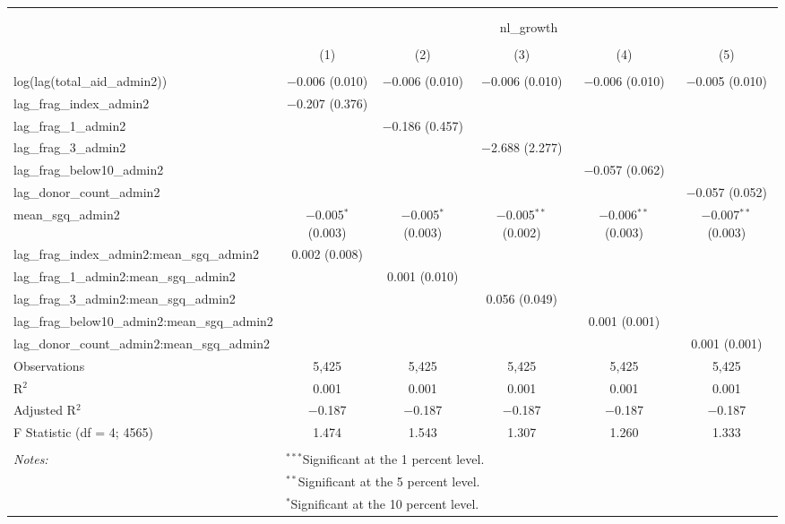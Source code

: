 
\begin{table}[!htbp] \centering 
  \caption{} 
  \label{} 
\begin{tabular}{@{\extracolsep{2pt}}lccccc} 
\\[-1.8ex]\hline 
\hline \\[-1.8ex] 
\\[-1.8ex] & \multicolumn{5}{c}{nl\_growth} \\ 
\\[-1.8ex] & (1) & (2) & (3) & (4) & (5)\\ 
\hline \\[-1.8ex] 
 log(lag(total\_aid\_admin2)) & $-$0.006 (0.010) & $-$0.006 (0.010) & $-$0.006 (0.010) & $-$0.006 (0.010) & $-$0.005 (0.010) \\ 
  lag\_frag\_index\_admin2 & $-$0.207 (0.376) &  &  &  &  \\ 
  lag\_frag\_1\_admin2 &  & $-$0.186 (0.457) &  &  &  \\ 
  lag\_frag\_3\_admin2 &  &  & $-$2.688 (2.277) &  &  \\ 
  lag\_frag\_below10\_admin2 &  &  &  & $-$0.057 (0.062) &  \\ 
  lag\_donor\_count\_admin2 &  &  &  &  & $-$0.057 (0.052) \\ 
  mean\_sgq\_admin2 & $-$0.005$^{*}$ (0.003) & $-$0.005$^{*}$ (0.003) & $-$0.005$^{**}$ (0.002) & $-$0.006$^{**}$ (0.003) & $-$0.007$^{**}$ (0.003) \\ 
  lag\_frag\_index\_admin2:mean\_sgq\_admin2 & 0.002 (0.008) &  &  &  &  \\ 
  lag\_frag\_1\_admin2:mean\_sgq\_admin2 &  & 0.001 (0.010) &  &  &  \\ 
  lag\_frag\_3\_admin2:mean\_sgq\_admin2 &  &  & 0.056 (0.049) &  &  \\ 
  lag\_frag\_below10\_admin2:mean\_sgq\_admin2 &  &  &  & 0.001 (0.001) &  \\ 
  lag\_donor\_count\_admin2:mean\_sgq\_admin2 &  &  &  &  & 0.001 (0.001) \\ 
 Observations & 5,425 & 5,425 & 5,425 & 5,425 & 5,425 \\ 
R$^{2}$ & 0.001 & 0.001 & 0.001 & 0.001 & 0.001 \\ 
Adjusted R$^{2}$ & $-$0.187 & $-$0.187 & $-$0.187 & $-$0.187 & $-$0.187 \\ 
F Statistic (df = 4; 4565) & 1.474 & 1.543 & 1.307 & 1.260 & 1.333 \\ 
\hline \\[-1.8ex] 
\textit{Notes:} & \multicolumn{5}{l}{$^{***}$Significant at the 1 percent level.} \\ 
 & \multicolumn{5}{l}{$^{**}$Significant at the 5 percent level.} \\ 
 & \multicolumn{5}{l}{$^{*}$Significant at the 10 percent level.} \\ 
\end{tabular} 
\end{table} 
